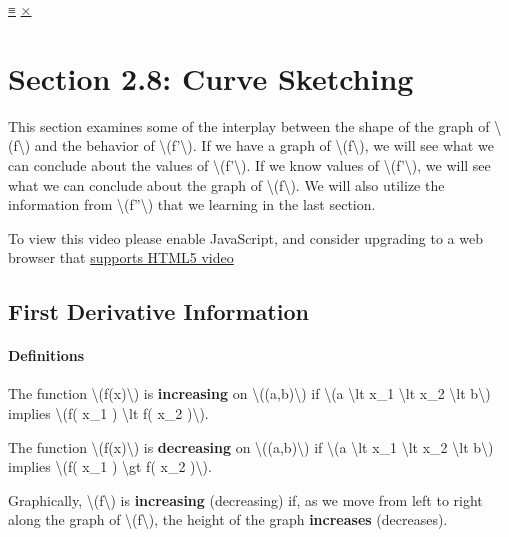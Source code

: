 \protect\hyperlink{main-nav}{≡} \protect\hyperlink{close-nav}{×}

\hypertarget{section-2.8-curve-sketching}{%
\section{Section 2.8: Curve
Sketching}\label{section-2.8-curve-sketching}}

This section examines some of the interplay between the shape of the
graph of \textbackslash{}(f\textbackslash{}) and the behavior of
\textbackslash{}(f'\textbackslash{}). If we have a graph of
\textbackslash{}(f\textbackslash{}), we will see what we can conclude
about the values of \textbackslash{}(f'\textbackslash{}). If we know
values of \textbackslash{}(f'\textbackslash{}), we will see what we can
conclude about the graph of \textbackslash{}(f\textbackslash{}). We will
also utilize the information from \textbackslash{}(f''\textbackslash{})
that we learning in the last section.

To view this video please enable JavaScript, and consider upgrading to a
web browser that \href{http://videojs.com/html5-video-support/}{supports
HTML5 video}

\hypertarget{first-derivative-information}{%
\subsection{First Derivative
Information}\label{first-derivative-information}}

\hypertarget{definitions}{%
\paragraph{Definitions}\label{definitions}}

The function \textbackslash{}(f(x)\textbackslash{}) is
\textbf{increasing} on \textbackslash{}((a,b)\textbackslash{}) if
\textbackslash{}(a \textbackslash{}lt x\_1 \textbackslash{}lt x\_2
\textbackslash{}lt b\textbackslash{}) implies \textbackslash{}(f( x\_1 )
\textbackslash{}lt f( x\_2 )\textbackslash{}).

The function \textbackslash{}(f(x)\textbackslash{}) is
\textbf{decreasing} on \textbackslash{}((a,b)\textbackslash{}) if
\textbackslash{}(a \textbackslash{}lt x\_1 \textbackslash{}lt x\_2
\textbackslash{}lt b\textbackslash{}) implies \textbackslash{}(f( x\_1 )
\textbackslash{}gt f( x\_2 )\textbackslash{}).

Graphically, \textbackslash{}(f\textbackslash{}) is \textbf{increasing}
(decreasing) if, as we move from left to right along the graph of
\textbackslash{}(f\textbackslash{}), the height of the graph
\textbf{increases} (decreases).


